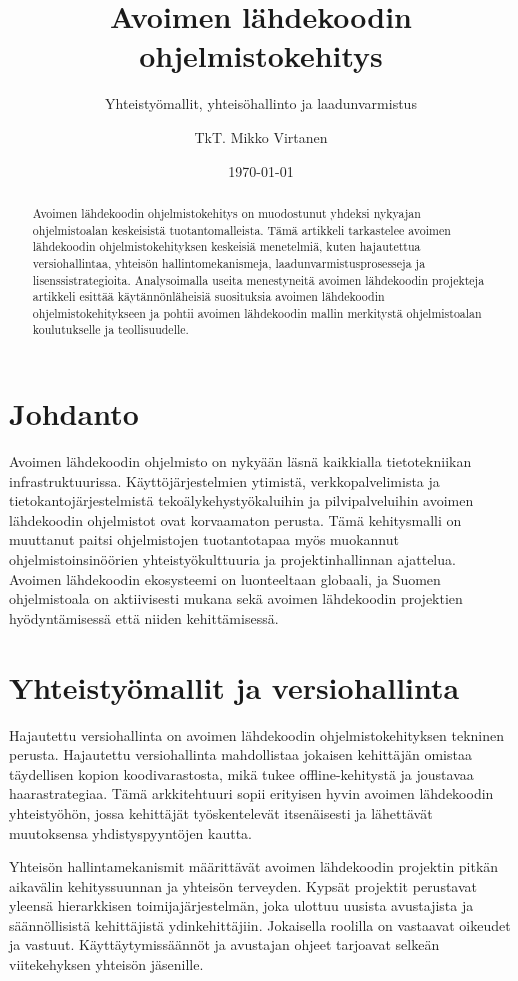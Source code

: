 \documentclass[
    language=finnish,
    doctype=article,
]{../../omnilatex}
\title{Avoimen lähdekoodin ohjelmistokehitys}
\subtitle{Yhteistyömallit, yhteisöhallinto ja laadunvarmistus}
\author{TkT. Mikko Virtanen}
\date{\today}
\begin{document}
\maketitle

\begin{abstract}
Avoimen lähdekoodin ohjelmistokehitys on muodostunut yhdeksi nykyajan ohjelmistoalan keskeisistä tuotantomalleista. Tämä artikkeli tarkastelee avoimen lähdekoodin ohjelmistokehityksen keskeisiä menetelmiä, kuten hajautettua versiohallintaa, yhteisön hallintomekanismeja, laadunvarmistusprosesseja ja lisenssistrategioita. Analysoimalla useita menestyneitä avoimen lähdekoodin projekteja artikkeli esittää käytännönläheisiä suosituksia avoimen lähdekoodin ohjelmistokehitykseen ja pohtii avoimen lähdekoodin mallin merkitystä ohjelmistoalan koulutukselle ja teollisuudelle.
\end{abstract}

\section{Johdanto}
Avoimen lähdekoodin ohjelmisto on nykyään läsnä kaikkialla tietotekniikan infrastruktuurissa. Käyttöjärjestelmien ytimistä, verkkopalvelimista ja tietokantojärjestelmistä tekoälykehystyökaluihin ja pilvipalveluihin avoimen lähdekoodin ohjelmistot ovat korvaamaton perusta. Tämä kehitysmalli on muuttanut paitsi ohjelmistojen tuotantotapaa myös muokannut ohjelmistoinsinöörien yhteistyökulttuuria ja projektinhallinnan ajattelua. Avoimen lähdekoodin ekosysteemi on luonteeltaan globaali, ja Suomen ohjelmistoala on aktiivisesti mukana sekä avoimen lähdekoodin projektien hyödyntämisessä että niiden kehittämisessä.

\section{Yhteistyömallit ja versiohallinta}
Hajautettu versiohallinta on avoimen lähdekoodin ohjelmistokehityksen tekninen perusta. Hajautettu versiohallinta mahdollistaa jokaisen kehittäjän omistaa täydellisen kopion koodivarastosta, mikä tukee offline-kehitystä ja joustavaa haarastrategiaa. Tämä arkkitehtuuri sopii erityisen hyvin avoimen lähdekoodin yhteistyöhön, jossa kehittäjät työskentelevät itsenäisesti ja lähettävät muutoksensa yhdistyspyyntöjen kautta.

Yhteisön hallintamekanismit määrittävät avoimen lähdekoodin projektin pitkän aikavälin kehityssuunnan ja yhteisön terveyden. Kypsät projektit perustavat yleensä hierarkkisen toimijajärjestelmän, joka ulottuu uusista avustajista ja säännöllisistä kehittäjistä ydinkehittäjiin. Jokaisella roolilla on vastaavat oikeudet ja vastuut. Käyttäytymissäännöt ja avustajan ohjeet tarjoavat selkeän viitekehyksen yhteisön jäsenille.
\end{document}
